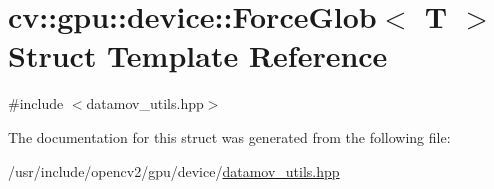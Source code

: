 \hypertarget{structcv_1_1gpu_1_1device_1_1ForceGlob}{\section{cv\-:\-:gpu\-:\-:device\-:\-:Force\-Glob$<$ T $>$ Struct Template Reference}
\label{structcv_1_1gpu_1_1device_1_1ForceGlob}
}


{\ttfamily \#include $<$datamov\-\_\-utils.\-hpp$>$}



The documentation for this struct was generated from the following file\-:\begin{DoxyCompactItemize}
\item 
/usr/include/opencv2/gpu/device/\hyperlink{datamov__utils_8hpp}{datamov\-\_\-utils.\-hpp}\end{DoxyCompactItemize}
